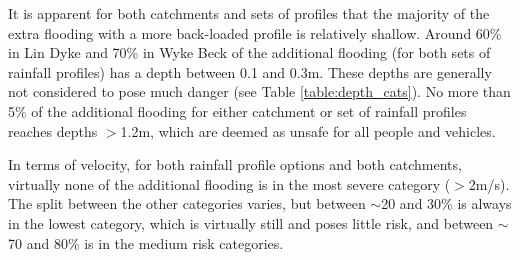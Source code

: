 \documentclass[APA,Times2COL]{WileyNJDv5}
\begin{document}
It is apparent for both catchments and sets of profiles that the majority of the extra flooding with a more back-loaded profile is relatively shallow. Around 60\% in Lin Dyke and 70\% in Wyke Beck of the additional flooding (for both sets of rainfall profiles) has a depth between 0.1 and 0.3m. These depths are generally not considered to pose much danger (see Table \ref{table:depth_cats}). No more than 5\% of the additional flooding for either catchment or set of rainfall profiles reaches depths $>$1.2m, which are deemed as unsafe for all people and vehicles. 

In terms of velocity, for both rainfall profile options and both catchments, virtually none of the additional flooding is in the most severe category ($>$2m/s). The split between the other categories varies, but between $\sim$20 and 30\% is always in the lowest category, which is virtually still and poses little risk, and between $\sim$70 and 80\% is in the medium risk categories.   
\end{document}
